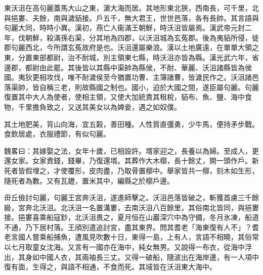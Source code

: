 
\begin{pinyinscope}
東沃沮在高句麗蓋馬大山之東，濵大海而居。其地形東北狹，西南長，可千里，北與挹婁、夫餘，南與濊貊接。戶五千，無大君王，世世邑落，各有長帥。其言語與句麗大同，時時小異。漢初，燕亡人衞滿王朝鮮，時沃沮皆屬焉。漢武帝元封二年，伐朝鮮，殺滿孫右渠，分其地為四郡，以沃沮城為玄菟郡。後為夷貊所侵，徙郡句麗西北，今所謂玄菟故府是也。沃沮還屬樂浪。漢以土地廣遠，在單單大領之東，分置東部都尉，治不耐城，別主領東七縣，時沃沮亦皆為縣。漢光武六年，省邊郡，都尉由此罷。其後皆以其縣中渠帥為縣侯，不耐、華麗、沃沮諸縣皆為侯國。夷狄更相攻伐，唯不耐濊侯至今猶置功曹、主簿諸曹，皆濊民作之。沃沮諸邑落渠帥，皆自稱三老，則故縣國之制也。國小，迫於大國之間，遂臣屬句麗。句麗復置其中大人為使者，使相主領，又使大加統責其租稅，貊布、魚、鹽、海中食物，千里擔負致之，又送其美女以為婢妾，遇之如奴僕。

其土地肥美，背山向海，宜五糓，善田種。人性質直彊勇，少牛馬，便持矛步戰。食飲居處，衣服禮節，有似句麗。

魏畧曰：其嫁娶之法，女年十歲，已相設許。壻家迎之，長養以為婦。至成人，更還女家。女家責錢，錢畢，乃復還壻。其葬作大木槨，長十餘丈，開一頭作戶。新死者皆假埋之，才使覆形，皮肉盡，乃取骨置槨中。舉家皆共一槨，刻木如生形，隨死者為數。又有瓦䥶，置米其中，編縣之於槨戶邊。

毌丘儉討句麗，句麗王宮奔沃沮，遂進師擊之。沃沮邑落皆破之，斬獲首虜三千餘級，宮奔北沃沮。北沃沮一名置溝婁，去南沃沮八百餘里，其俗南北皆同，與挹婁接。挹婁喜乘船寇鈔，北沃沮畏之，夏月恒在山巖深穴中為守備，冬月氷凍，船道不通，乃下居村落。王頎別遣追討宮，盡其東界。問其耆老「海東復有人不」？耆老言國人嘗乘船捕魚，遭風見吹數十日，東得一島，上有人，言語不相曉，其俗常以七月取童女沈海。又言有一國亦在海中，純女無男。又說得一布衣，從海中浮出，其身如中國人衣，其兩袖長三丈。又得一破船，隨波出在海岸邊，有一人項中復有面，生得之，與語不相通，不食而死。其域皆在沃沮東大海中。


\end{pinyinscope}